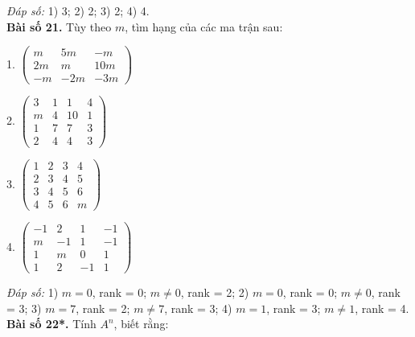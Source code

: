         
        \textit{Đáp số:}
        1) 3;
        2) 2;
        3) 2;
        4) 4.\\
\textbf{Bài số 21.} Tùy theo \(m\), tìm hạng của các ma trận sau:
        
        1.
        \(
        \begin{pmatrix}
        m & 5m & -m \\
        2m & m & 10m \\
        -m & -2m & -3m
        \end{pmatrix}
        \)\\
        \vspace*{0.5cm}

        
        2.
        \(
        \begin{pmatrix}
        3 & 1 & 1 & 4 \\
        m & 4 & 10 & 1 \\
        1 & 7 & 7 & 3 \\
        2 & 4 & 4 & 3
        \end{pmatrix}
        \)\\
        \vspace*{0.5cm}

        
        3.
        \(
        \begin{pmatrix}
        1 & 2 & 3 & 4 \\
        2 & 3 & 4 & 5 \\
        3 & 4 & 5 & 6 \\
        4 & 5 & 6 & m
        \end{pmatrix}
        \)\\
        \vspace*{0.5cm}

        
        4.
        \(
        \begin{pmatrix}
        -1 & 2 & 1 & -1 \\
        m & -1 & 1 & -1 \\
        1 & m & 0 & 1 \\
        1 & 2 & -1 & 1
        \end{pmatrix}
        \)\\
        \vspace*{0.5cm}

        
        \textit{Đáp số:}
        1) \(m = 0\), rank = 0; \(m \neq 0\), rank = 2;
        2) \(m = 0\), rank = 0; \(m \neq 0\), rank = 3;
        3) \(m = 7\), rank = 2; \(m \neq 7\), rank = 3;
        4) \(m = 1\), rank = 3; \(m \neq 1\), rank = 4.\\
\textbf{Bài số 22*.} Tính \(A^n\), biết rằng:
        
